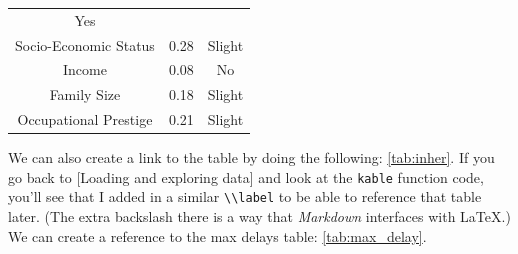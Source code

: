 \documentclass[12pt,twoside]{amherstthesis}
\begin{document}
\begin{longtable}[]{@{}ccc@{}}
\begin{minipage}[t]{0.16\columnwidth}
  Yes\strut
  \end{minipage}\tabularnewline
  \begin{minipage}[t]{0.29\columnwidth}\centering\strut
  Socio-Economic Status\strut
  \end{minipage} & \begin{minipage}[t]{0.47\columnwidth}\centering\strut
  0.28\strut
  \end{minipage} & \begin{minipage}[t]{0.16\columnwidth}\centering\strut
  Slight\strut
  \end{minipage}\tabularnewline
  \begin{minipage}[t]{0.29\columnwidth}\centering\strut
  Income\strut
  \end{minipage} & \begin{minipage}[t]{0.47\columnwidth}\centering\strut
  0.08\strut
  \end{minipage} & \begin{minipage}[t]{0.16\columnwidth}\centering\strut
  No\strut
  \end{minipage}\tabularnewline
  \begin{minipage}[t]{0.29\columnwidth}\centering\strut
  Family Size\strut
  \end{minipage} & \begin{minipage}[t]{0.47\columnwidth}\centering\strut
  0.18\strut
  \end{minipage} & \begin{minipage}[t]{0.16\columnwidth}\centering\strut
  Slight\strut
  \end{minipage}\tabularnewline
  \begin{minipage}[t]{0.29\columnwidth}\centering\strut
  Occupational Prestige\strut
  \end{minipage} & \begin{minipage}[t]{0.47\columnwidth}\centering\strut
  0.21\strut
  \end{minipage} & \begin{minipage}[t]{0.16\columnwidth}\centering\strut
  Slight\strut
  \end{minipage}\tabularnewline
  \bottomrule
  \end{longtable}
  
  We can also create a link to the table by doing the following:
  \autoref{tab:inher}. If you go back to {[}Loading and exploring data{]}
  and look at the \texttt{kable} function code, you'll see that I added in
  a similar \texttt{\textbackslash{}\textbackslash{}label} to be able to
  reference that table later. (The extra backslash there is a way that
  \emph{Markdown} interfaces with \LaTeX.) We can create a reference to
  the max delays table: \autoref{tab:max_delay}.
  
\end{document}
